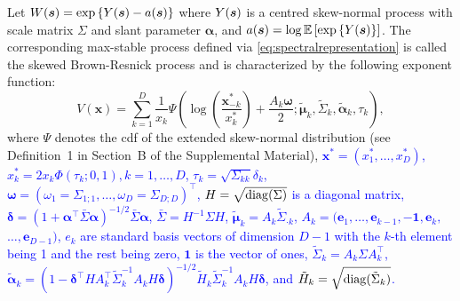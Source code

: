 \documentclass[12pt]{article}
\newcommand{\PZ}{\textcolor{blue}}
\begin{document}
\begin{theorem}
\label{thm:skewBR}
Let $W({\boldsymbol{s}}) = \exp \left\{ Y({\boldsymbol{s}}) - a({\boldsymbol{s}})\right\}$ where $Y({\boldsymbol{s}})$ is a centred skew-normal process with scale matrix $\Sigma$ and slant parameter $\bm \alpha$, and $a({\boldsymbol{s}}) = \log \mathbb{E} \left[ \exp\left\{ Y({\boldsymbol{s}}) \right\}\right]$.
The corresponding max-stable process defined via \eqref{eq:spectralrepresentation} is called the skewed Brown-Resnick process and is characterized by the following exponent function:
%
\begin{equation}
\label{eq:V_skBR}
V(\bm x) =\sum_{k=1}^D \frac{1}{x_k} 
\Psi \left(\log \left( \frac{\bm x^*_{-k}}{x^*_k} \right) + \frac{A_k\bm\omega}{2} ; \tilde{\bm\mu}_k, \tilde\Sigma_k, \tilde{\bm \alpha}_k, \tau_k \right),
\end{equation}
%
where $\Psi$ denotes the cdf of the extended skew-normal distribution (see Definition~1 in Section~B of the Supplemental Material),
\PZ{$\bm x^* = \left( x^*_1, \ldots, x^*_D\right)$, 
$x^*_k = 2x_k \Phi\left( \tau_k; 0, 1 \right), k=1, \ldots, D$,
$\tau_k = \sqrt{\Sigma_{kk}}\delta_k$, $\bm\omega = \left( \omega_1=\Sigma_{1;1}, \ldots,  \omega_D=\Sigma_{D;D}\right)^\top$, $H = \sqrt{{\rm diag}(\Sigma)}$ is a diagonal matrix, 
$\bm \delta = \left( 1 + \bm \alpha^\top \bar{\Sigma} \bm \alpha\right)^{-1/2}\bar{\Sigma} \bm \alpha$, 
$\bar{\Sigma} = H^{-1} \Sigma H$,
$\tilde{\bm\mu}_k = A_k \tilde\Sigma_{\cdot k}$, 
$A_k = (\bm e_1, \ldots,\bm e_{k-1}, -\bm 1,\bm e_{k},$ $\ldots,\bm e_{D-1})$, }
\PZ{$e_k$ are standard basis vectors of dimension $D-1$ with the $k$-th element being 1 and the rest being zero, $\bm 1$ is the vector of ones, 
$\tilde\Sigma_k = A_k \Sigma A_k^\top$, 
$\tilde{\bm\alpha}_k = \left(1-\bm\delta^\top H A_k^\top\tilde\Sigma_k^{-1} A_k H\bm\delta \right)^{-1/2} \tilde{H}_k\tilde\Sigma_k^{-1}A_k H\bm\delta$, 
and $\tilde{H}_k = \sqrt{{\rm diag}(\tilde\Sigma_k)}$.}
\end{theorem}
\end{document}
